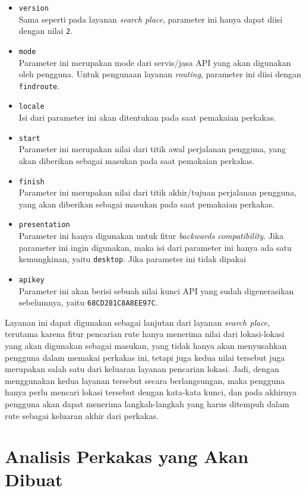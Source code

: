 \begin{itemize}
	\item \verb|version|\\
	Sama seperti pada layanan \textit{search place}, parameter ini hanya dapat diisi dengan nilai \verb|2|.
	\item \verb|mode|\\
	Parameter ini merupakan mode dari servis/jasa API yang akan digunakan oleh pengguna. Untuk pengunaan layanan \textit{routing}, parameter ini diisi dengan \verb|findroute|.
	\item \verb|locale|\\
	Isi dari parameter ini akan ditentukan pada saat pemakaian perkakas.
	\item \verb|start|\\
	Parameter ini merupakan nilai \latlon dari titik awal perjalanan pengguna, yang akan diberikan sebagai masukan pada saat pemakaian perkakas.
	\item \verb|finish|\\
	Parameter ini merupakan nilai \latlon dari titik akhir/tujuan perjalanan pengguna, yang akan diberikan sebagai masukan pada saat pemakaian perkakas.
	\item \verb|presentation|\\
	Parameter ini hanya digunakan untuk fitur \textit{backwards compatibility}. Jika parameter ini ingin digunakan, maka isi dari parameter ini hanya ada satu kemungkinan, yaitu \verb|desktop|. Jika parameter ini tidak dipakai
	\item \verb|apikey|\\
	Parameter ini akan berisi sebuah nilai kunci API yang sudah digenerasikan sebelumnya, yaitu \verb|68CD281C8A8EE97C|.
\end{itemize}
\vspace{\baselineskip}\noindent
Layanan ini dapat digunakan sebagai lanjutan dari layanan \textit{search place}, terutama karena fitur pencarian rute hanya menerima nilai \latlon dari lokasi-lokasi yang akan digunakan sebagai masukan, yang tidak hanya akan menyusahkan pengguna dalam memakai perkakas \cl ini, tetapi juga kedua nilai tersebut juga merupakan salah satu dari keluaran layanan pencarian lokasi. Jadi, dengan menggunakan kedua layanan tersebut secara berlangsungan, maka pengguna hanya perlu mencari lokasi tersebut dengan kata-kata kunci, dan pada akhirnya pengguna akan dapat menerima langkah-langkah yang harus ditempuh dalam rute sebagai keluaran akhir dari perkakas.

\section{Analisis Perkakas yang Akan Dibuat}
\label{sec:analysis-thesisapp}

